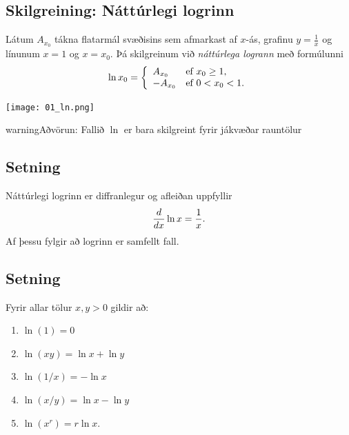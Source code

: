 \documentclass[a4paper,10pt,icelandic]{sphinxmanual}
\begin{document}
\subsection{Skilgreining: Náttúrlegi logrinn}
\label{kafli04:skilgreining-natturlegi-logrinn}\label{kafli04:index-0}
Látum \(A_{x_0}\) tákna flatarmál svæðisins sem afmarkast af
\(x\)-ás, grafinu \(y=\frac{1}{x}\) og línunum \(x=1\) og
\(x=x_0\). Þá skilgreinum við \textit{náttúrlega logrann} með formúlunni
\begin{gather}
\begin{split}\ln x_0 =\left\{\begin{array}{ll}
A_{x_0} & \mbox{ef }x_0 \geq 1,\\
-A_{x_0} & \mbox{ef }0<x_0<1.
\end{array}
\right.\end{split}\notag
\end{gather}

\begin{center}
\texttt{[image: 01\_ln.png]}
\end{center}


\begin{notice}{warning}{Aðvörun:}
Fallið \(\ln\) er bara skilgreint fyrir jákvæðar rauntölur
\end{notice}


\subsection{Setning}
\label{kafli04:setning}
Náttúrlegi logrinn er diffranlegur og afleiðan uppfyllir
\begin{gather}
\begin{split}\frac{d}{dx}\ln x=\frac{1}{x}.\end{split}\notag
\end{gather}
Af þessu fylgir að logrinn er samfellt fall.


\subsection{Setning}
\label{kafli04:id1}
Fyrir allar tölur \(x,y>0\) gildir að:
\begin{enumerate}
\item {} 
\(\ln(1) = 0\)

\item {} 
\(\ln(xy)=\ln x+\ln y\)

\item {} 
\(\ln(1/x)=-\ln x\)

\item {} 
\(\ln(x/y)=\ln x-\ln y\)

\item {} 
\(\ln (x^r)=r\ln x\).

\end{enumerate}
\end{document}
